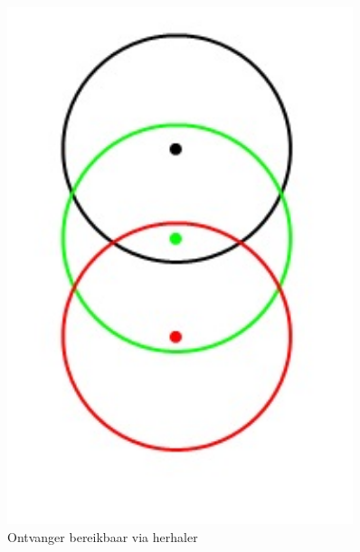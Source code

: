 \documentclass[a4paper,10pt]{article}
\begin{document}
\begin{figure}[ht!]
\begin{minipage}{\textwidth}
\begin{minipage}{0.3\textwidth}
            \includegraphics[width=0.9\textwidth]{twee.jpg}
            \caption*{Ontvanger bereikbaar via herhaler}
        \end{minipage}
        \hfill
        \begin{minipage}{0.3\textwidth}
            \centering

\end{minipage}
\end{minipage}
\end{figure}
\end{document}
